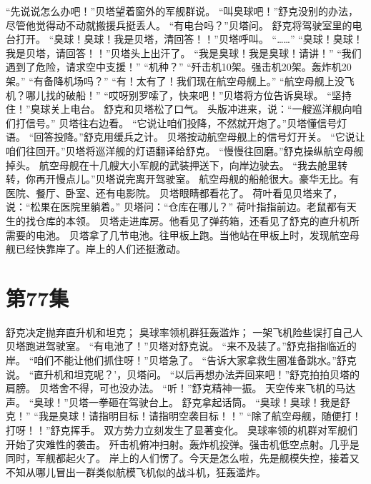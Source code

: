\documentclass[a4paper,12pt,UTF8,twoside]{ctexbook}
\begin{document}
        “先说说怎么办吧！”贝塔望着窗外的军舰群说。 
        “叫臭球吧！”舒克没别的办法，尽管他觉得动不动就搬援兵挺丢人。 
        “有电台吗？”贝塔问。 
        舒克将驾驶室里的电台打开。 
        “臭球！臭球！我是贝塔，清回答！！”贝塔呼叫。 
        “……” 
        “臭球！臭球！我是贝塔，请回答！！”贝塔头上出汗了。 
        “我是臭球！我是臭球！请讲！” 
        “我们遇到了危险，请求空中支援！” 
        “机种？” 
        “歼击机10架。强击机20架。轰炸机20架。” 
        “有备降机场吗？” 
        “有！太有了！我们现在航空母舰上。” 
        “航空母舰上没飞机？哪儿找的破船！” 
        “哎呀别罗嗦了，快来吧！”贝塔将方位告诉臭球。 
        “坚持住！”臭球关上电台。 
        舒克和贝塔松了口气。 
        头版冲进来，说：“一艘巡洋舰向咱们打信号。” 
        贝塔往右边看。 
        “它说让咱们投降，不然就开炮了。”贝塔懂信号灯语。 
        “回答投降。”舒克用缓兵之计。 
        贝塔按动航空母舰上的信号灯开关。 
        “它说让咱们往回开。”贝塔将巡洋舰的灯语翻译给舒克。 
        “慢慢往回磨。”舒克操纵航空母舰掉头。 
        航空母舰在十几艘大小军舰的武装押送下，向岸边驶去。 
        “我去舱里转转，你再开慢点儿。”贝塔说完离开驾驶室。 
        航空母舰的船舱很大。豪华无比。有医院、餐厅、卧室、还有电影院。 
        贝塔眼睛都看花了。 
        荷叶看见贝塔来了，说：“松果在医院里躺着。” 
        贝塔问：“仓库在哪儿？” 
        荷叶指指前边。老鼠都有天生的找仓库的本领。 
        贝塔走进库房。他看见了弹药箱，还看见了舒克的直升机所需要的电池。 
        贝塔拿了几节电池。往甲板上跑。当他站在甲板上时，发现航空母舰已经快靠岸了。岸上的人们还挺激动。   \chapter{第77集} 
        舒克决定抛弃直升机和坦克； 
        臭球率领机群狂轰滥炸； 
        一架飞机险些误打自己人   
        贝塔跑进驾驶室。 
        “有电池了！”贝塔对舒克说。 
        “来不及装了。”舒克指指临近的岸。 
        “咱们不能让他们抓住呀！”贝塔急了。 
        “告诉大家拿救生圈准备跳水。”舒克说。 
        “直升机和坦克呢？’，贝塔问。 
        “以后再想办法弄回来吧！”舒克拍拍贝塔的肩膀。 
        贝塔舍不得，可也没办法。 
        “听！”舒克精神一振。 
        天空传来飞机的马达声。 
        “臭球！”贝塔一拳砸在驾驶台上。 
        舒克拿起话筒。 
        “臭球！臭球！我是舒克！” 
        “我是臭球！请指明目标！请指明空袭目标！！” 
        “除了航空母舰，随便打！打呀！！”舒克挥手。 
        双方势力立刻发生了显著变化。 
        臭球率领的机群对军舰们开始了灾难性的袭击。 
        歼击机俯冲扫射。轰炸机投弹。强击机低空点射。几乎是同时，军舰都起火了。 
        岸上的人们愣了。今天是怎么啦，先是舰模失控，接着又不知从哪儿冒出一群类似航模飞机似的战斗机，狂轰滥炸。 
\end{document}
